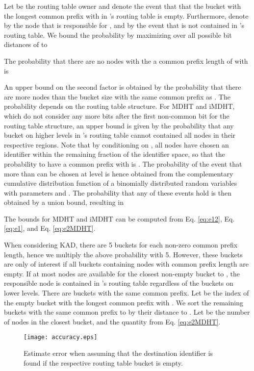 \documentclass[10pt, conference, compsocconf, letterpaper]{IEEEtran}
\begin{document}
Let  be the routing table owner and  denote the event that
that the bucket with the longest common prefix with  
in 's routing table is empty. Furthermore, denote by  the node
that is responsible for , and by  the event that  is
not contained in 's routing table.
We bound the probability by maximizing over all possible bit distances of  to
 

The probability that there are no nodes with the a common prefix length of  with
 is

An upper bound on the second factor is obtained by the
probability that there are more nodes than the bucket size with the same common
prefix as .
The probability depends on the routing table structure.
For MDHT and iMDHT, which do not consider any more bits after the first non-common
bit for the routing table structure, an upper bound is given by the probability
that any bucket on higher levels in 's routing table cannot contained all nodes in their respective regions.
Note that by conditioning on , all nodes have chosen an identifier within
the remaining fraction  of the identifier space,
so that the probability to have a common prefix  with  is
.
The probability of the event  that more than  can be chosen at level  
is hence obtained from the complementary cumulative distribution function
of a binomially distributed random variables with parameters  and
. 
The probability that any of these events  hold is then obtained by a union
bound, resulting in  

The bounds for MDHT and iMDHT can be computed from Eq. \ref{eq:e12}, Eq. \ref{eq:e1}, and Eq. \ref{eq:e2MDHT}.

When considering KAD, there are 5 buckets for each non-zero common prefix length, hence we multiply the above probability
with 5. 
However, these buckets are only of interest if all buckets containing nodes with common prefix length 
are empty. 
If at most  nodes are available for the closest non-empty bucket to , the responsible node is
contained in 's routing table regardless of the buckets on lower levels.
There are  buckets with the same common prefix. 
Let  be the index of the empty bucket with the longest common prefix with .
We sort the remaining  buckets with the same common prefix to  by their distance to . Let  be the number of nodes in the 
closest bucket, and 
the quantity from Eq. \ref{eq:e2MDHT}. 

\begin{figure}
\captionsetup{font=scriptsize}
\texttt{[image: accuracy.eps]}
\caption{Estimate error when assuming that the destination identifier  is found if the respective routing table bucket is empty.}
\label{fig:error}
\end{figure}
\end{document}
